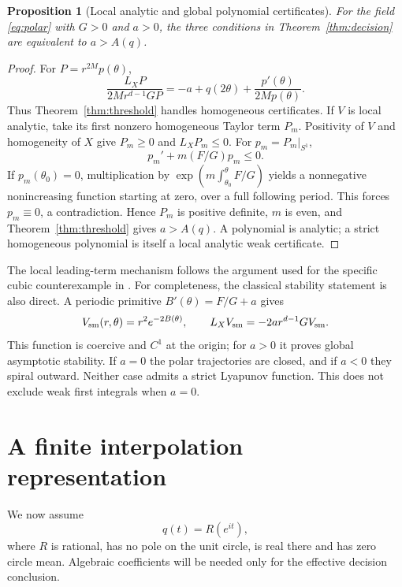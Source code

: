 \documentclass[11pt,a4paper]{article}
\newtheorem{proposition}[theorem]{Proposition}
\theoremstyle{remark}\newtheorem{remark}[theorem]{Remark}
\begin{document}
\begin{proposition}[Local analytic and global polynomial certificates]
\label{prop:analytic}
For the field \eqref{eq:polar} with \(G>0\) and \(a>0\), the three
conditions in Theorem~\ref{thm:decision} are equivalent to \(a>A(q)\).
\end{proposition}
\begin{proof}
For \(P=r^{2M}p(\theta)\),
\begin{equation}\label{eq:lie}
 \frac{L_XP}{2M r^{d-1}G P}
 =-a+q(2\theta)+\frac{p'(\theta)}{2M p(\theta)}.
\end{equation}
Thus Theorem~\ref{thm:threshold} handles homogeneous certificates.
If \(V\) is local analytic, take its first nonzero homogeneous
Taylor term \(P_m\). Positivity of \(V\) and homogeneity of \(X\)
give \(P_m\geq0\) and \(L_XP_m\leq0\).
For \(p_m=P_m|_{S^1}\),
\[
 p_m'+m(F/G)p_m\leq0.
\]
If \(p_m(\theta_0)=0\), multiplication by
\(\exp(m\int_{\theta_0}^{\theta}F/G)\) yields a nonnegative
nonincreasing function starting at zero, over a full following
period. This forces \(p_m\equiv0\), a contradiction. Hence \(P_m\)
is positive definite, \(m\) is even, and
Theorem~\ref{thm:threshold} gives \(a>A(q)\).
A polynomial is analytic; a strict homogeneous polynomial is
itself a local analytic weak certificate.
\end{proof}

The local leading-term mechanism follows the argument used for the
specific cubic counterexample in \cite{liu}.
For completeness, the classical stability statement is also direct.
A periodic primitive \(B'(\theta)=F/G+a\) gives
\[
 V_{\rm sm}(r,\theta)=r^2 e^{-2B(\theta)},\qquad
 L_XV_{\rm sm}=-2a r^{d-1}G V_{\rm sm}.
\]
This function is coercive and \(C^1\) at the origin; for \(a>0\)
it proves global asymptotic stability. If \(a=0\) the polar trajectories
are closed, and if \(a<0\) they spiral outward. Neither case admits
a strict Lyapunov function. This does not exclude weak first integrals
when \(a=0\).

\section{A finite interpolation representation}
We now assume
\begin{equation}\label{eq:rational}
 q(t)=R(e^{it}),
\end{equation}
where \(R\) is rational, has no pole on the unit circle, is real
there and has zero circle mean. Algebraic coefficients will be
needed only for the effective decision conclusion.
\end{document}
